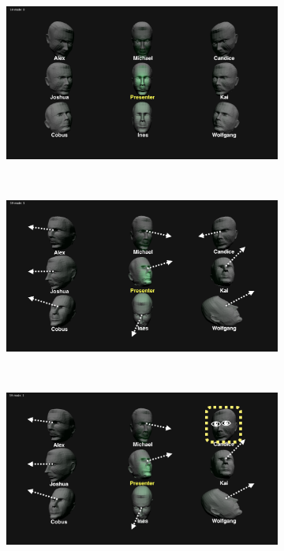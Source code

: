 \begin{figure}
     \centering
     \begin{subfigure}[b]{0.3\textwidth}
         \centering
         \includegraphics[width=\textwidth]{expA-1.png}
         \caption{}
     \end{subfigure}
     ~
     \begin{subfigure}[b]{0.3\textwidth}
         \centering
         \includegraphics[width=\textwidth]{expA2.png}
         \caption{}
     \end{subfigure}
     ~
     \begin{subfigure}[b]{0.3\textwidth}
         \centering
         \includegraphics[width=\textwidth]{expA3.png}

\end{subfigure}
\end{figure}
